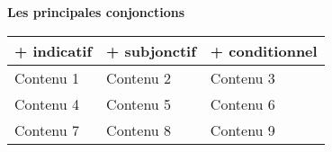 \documentclass{report}
\begin{document}
\begin{center}
    \textbf{Les principales conjonctions}
    \begin{tabular}{|p{}|p{}|p{}|}
        \hline
        \textbf{+ indicatif} & \textbf{+ subjonctif} & \textbf{+ conditionnel} \\
        \hline
        Contenu 1 & Contenu 2 & Contenu 3 \\
        \hline
        Contenu 4 & Contenu 5 & Contenu 6 \\
        \hline
        Contenu 7 & Contenu 8 & Contenu 9 \\
        \hline
    \end{tabular}
\end{center}

\printbibliography
\end{document}
